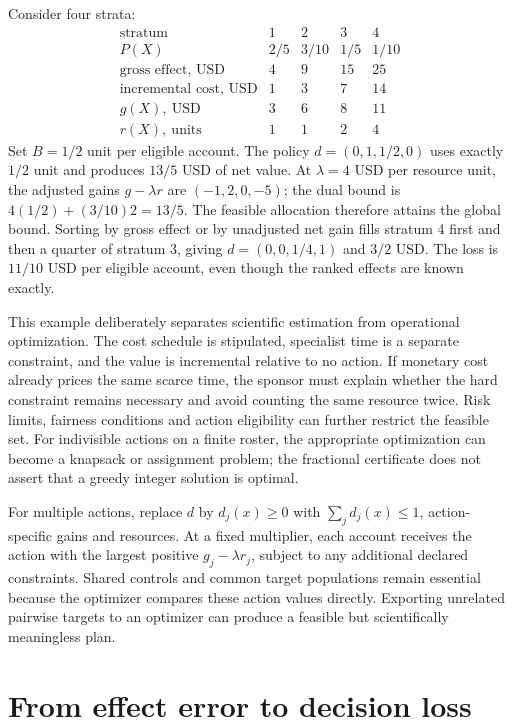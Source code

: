 Consider four strata:
\[
\begin{array}{c|rrrr}
 \text{stratum}&1&2&3&4\\ \hline
 P(X)&2/5&3/10&1/5&1/10\\
 \text{gross effect, USD}&4&9&15&25\\
 \text{incremental cost, USD}&1&3&7&14\\
 g(X),\ \text{USD}&3&6&8&11\\
 r(X),\ \text{units}&1&1&2&4
\end{array}
\]
Set $B=1/2$ unit per eligible account. The policy
$d=(0,1,1/2,0)$ uses exactly $1/2$ unit and produces $13/5$ USD of net value.
At $\lambda=4$ USD per resource unit, the adjusted gains
$g-\lambda r$ are $(-1,2,0,-5)$; the dual bound is
$4(1/2)+(3/10)2=13/5$. The feasible allocation therefore attains the global
bound. Sorting by gross effect or by unadjusted net gain fills stratum 4
first and then a quarter of stratum 3, giving
$d=(0,0,1/4,1)$ and $3/2$ USD. The loss is $11/10$ USD per eligible
account, even though the ranked effects are known exactly.~\citep{exec17_s4_math}

This example deliberately separates scientific estimation from operational
optimization. The cost schedule is stipulated, specialist time is a separate
constraint, and the value is incremental relative to no action. If monetary
cost already prices the same scarce time, the sponsor must explain whether
the hard constraint remains necessary and avoid counting the same resource
twice. Risk limits, fairness conditions and action eligibility can further
restrict the feasible set. For indivisible actions on a finite roster, the
appropriate optimization can become a knapsack or assignment problem; the
fractional certificate does not assert that a greedy integer solution is
optimal.

For multiple actions, replace $d$ by $d_j(x)\geq0$ with
$\sum_jd_j(x)\leq1$, action-specific gains and resources. At a fixed
multiplier, each account receives the action with the largest positive
$g_j-\lambda r_j$, subject to any additional declared constraints. Shared
controls and common target populations remain essential because the optimizer
compares these action values directly. Exporting unrelated pairwise targets
to an optimizer can produce a feasible but scientifically meaningless plan.

\section{From effect error to decision loss}
\label{exec17:s4-regret}

